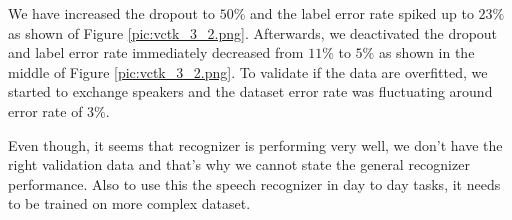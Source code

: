 
We have increased the dropout to $50\%$ and the label error rate spiked up to $23\%$ as shown of Figure \ref{pic:vctk_3_2.png}.
Afterwards, we deactivated the dropout and label error rate immediately decreased from $11\%$ to $5\%$ as shown in the middle of Figure \ref{pic:vctk_3_2.png}.
To validate if the data are overfitted, we started to exchange speakers and the dataset error rate was fluctuating around error rate of $3\%$.


Even though, it seems that recognizer is performing very well, we don't have the right validation data and that's why we cannot state the general recognizer performance.
Also to use this the speech recognizer in day to day tasks, it needs to be trained on more complex dataset.
